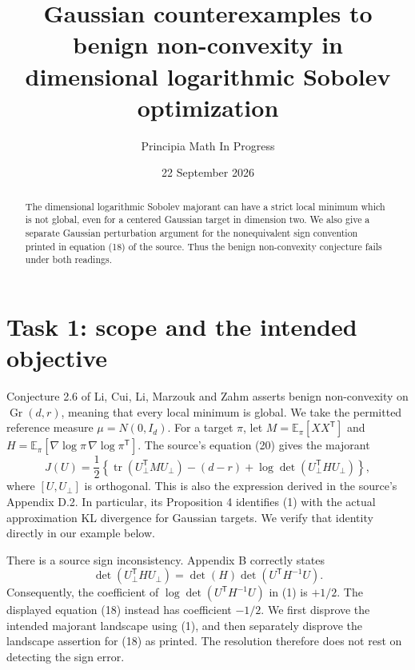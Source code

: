 \documentclass[11pt]{article}
\title{Gaussian counterexamples to benign non-convexity\newline
in dimensional logarithmic Sobolev optimization}
\author{Principia Math In Progress}
\date{22 September 2026}
\newcommand{\Gr}{\operatorname{Gr}}
\newcommand{\tr}{\operatorname{tr}}
\begin{document}
\maketitle
\begin{abstract}
The dimensional logarithmic Sobolev majorant can have a strict local
minimum which is not global, even for a centered Gaussian target in
dimension two. We also give a separate Gaussian perturbation argument
for the nonequivalent sign convention printed in equation (18) of the
source. Thus the benign non-convexity conjecture fails under both readings.
\end{abstract}

\section*{Task 1: scope and the intended objective}
Conjecture 2.6 of Li, Cui, Li, Marzouk and Zahm \cite{source} asserts
benign non-convexity on $\Gr(d,r)$, meaning that every local minimum is
global. We take the permitted reference measure $\mu=N(0,I_d)$.
For a target $\pi$, let $M=\mathbb E_\pi[XX^{\mathsf T}]$ and
$H=\mathbb E_\pi[\nabla\log\pi\,\nabla\log\pi^{\mathsf T}]$.
The source's equation (20) gives the majorant
\[
 J(U)=\frac12\left\{\tr(U_\perp^{\mathsf T}MU_\perp)
 -(d-r)+\log\det(U_\perp^{\mathsf T}HU_\perp)\right\},       \tag{1}
\]
where $[U,U_\perp]$ is orthogonal. This is also the expression derived
in the source's Appendix D.2. In particular, its Proposition 4
identifies (1) with the actual approximation KL divergence for Gaussian
targets. We verify that identity directly in our example below.

There is a source sign inconsistency. Appendix B correctly states
\[
 \det(U_\perp^{\mathsf T}HU_\perp)
 =\det(H)\det(U^{\mathsf T}H^{-1}U).
\]
Consequently, the coefficient of $\log\det(U^{\mathsf T}H^{-1}U)$ in
(1) is $+1/2$. The displayed equation (18) instead has coefficient
$-1/2$. We first disprove the intended majorant landscape using (1),
and then separately disprove the landscape assertion for (18) as printed.
The resolution therefore does not rest on detecting the sign error.
\end{document}
